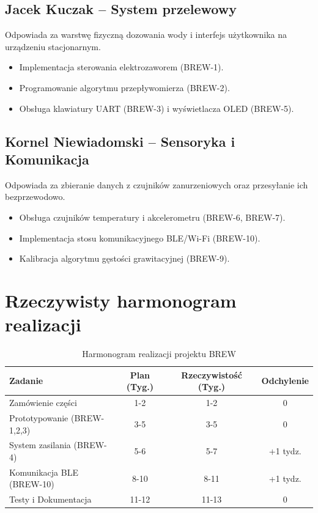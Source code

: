 \documentclass[12pt,a4paper]{article}
\begin{document}
\subsection{Jacek Kuczak -- System przelewowy}
Odpowiada za warstwę fizyczną dozowania wody i interfejs użytkownika na urządzeniu stacjonarnym.
\begin{itemize}
    \item Implementacja sterowania elektrozaworem (BREW-1).
    \item Programowanie algorytmu przepływomierza (BREW-2).
    \item Obsługa klawiatury UART (BREW-3) i wyświetlacza OLED (BREW-5).
\end{itemize}

\subsection{Kornel Niewiadomski -- Sensoryka i Komunikacja}
Odpowiada za zbieranie danych z czujników zanurzeniowych oraz przesyłanie ich bezprzewodowo.
\begin{itemize}
    \item Obsługa czujników temperatury i akcelerometru (BREW-6, BREW-7).
    \item Implementacja stosu komunikacyjnego BLE/Wi-Fi (BREW-10).
    \item Kalibracja algorytmu gęstości grawitacyjnej (BREW-9).
\end{itemize}

\section{Rzeczywisty harmonogram realizacji}
\begin{table}[h!]
\centering
\begin{tabular}{|l|c|c|c|}
\hline
\textbf{Zadanie} & \textbf{Plan (Tyg.)} & \textbf{Rzeczywistość (Tyg.)} & \textbf{Odchylenie} \\ \hline
Zamówienie części & 1-2 & 1-2 & 0 \\ \hline
Prototypowanie (BREW-1,2,3) & 3-5 & 3-5 & 0 \\ \hline
System zasilania (BREW-4) & 5-6 & 5-7 & +1 tydz. \\ \hline
Komunikacja BLE (BREW-10) & 8-10 & 8-11 & +1 tydz. \\ \hline
Testy i Dokumentacja & 11-12 & 11-13 & 0 \\ \hline
\end{tabular}
\caption{Harmonogram realizacji projektu BREW}
\end{table}
\end{document}
